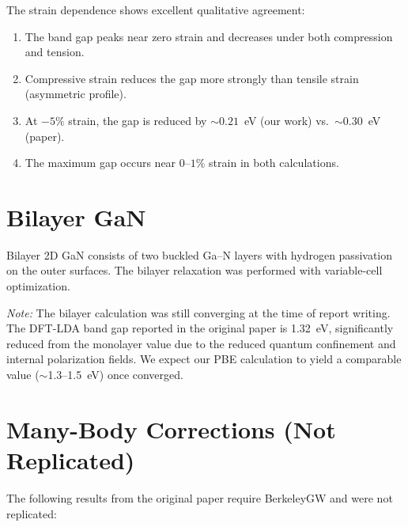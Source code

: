 \documentclass[11pt]{article}
\begin{document}
The strain dependence shows excellent qualitative agreement:
\begin{enumerate}
    \item The band gap peaks near zero strain and decreases under both compression and tension.
    \item Compressive strain reduces the gap more strongly than tensile strain (asymmetric profile).
    \item At $-5\%$ strain, the gap is reduced by $\sim 0.21$~eV (our work) vs.\ $\sim 0.30$~eV (paper).
    \item The maximum gap occurs near $0$--$1\%$ strain in both calculations.
\end{enumerate}

\section{Bilayer GaN}
\label{sec:bilayer}

Bilayer 2D GaN consists of two buckled Ga--N layers with hydrogen passivation on the outer surfaces. The bilayer relaxation was performed with variable-cell optimization.

\textit{Note:} The bilayer calculation was still converging at the time of report writing. The DFT-LDA band gap reported in the original paper is 1.32~eV, significantly reduced from the monolayer value due to the reduced quantum confinement and internal polarization fields. We expect our PBE calculation to yield a comparable value ($\sim$1.3--1.5~eV) once converged.

\section{Many-Body Corrections (Not Replicated)}

The following results from the original paper require BerkeleyGW and were not replicated:
\end{document}
